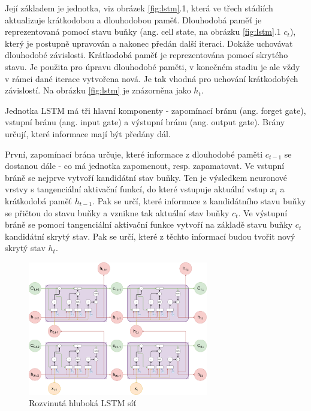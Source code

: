 Její základem je jednotka, viz obrázek \ref{fig:lstm}.1, která ve třech
stádiích aktualizuje krátkodobou a dlouhodobou paměť. Dlouhodobá paměť je
reprezentovaná pomocí stavu buňky (ang. cell state, na obrázku \ref{fig:lstm}.1
$c_t$), který je postupně upravován a nakonec předán další iteraci. Dokáže
uchovávat dlouhodobé závislosti. Krátkodobá paměť je reprezentována pomocí
skrytého stavu. Je použita pro úpravu dlouhodobé paměti, v konečném stadiu je
ale vždy v rámci dané iterace vytvořena nová. Je tak vhodná pro uchování
krátkodobých závislostí. Na obrázku \ref{fig:lstm} je znázorněna jako $h_t$.

Jednotka LSTM má tři hlavní komponenty - zapomínací bránu (ang. forget gate),
vstupní bránu (ang. input gate) a výstupní bránu (ang. output gate). Brány
určují, které informace mají být předány dál.

První, zapomínací brána určuje, které informace z dlouhodobé paměti $c_{t-1}$
se dostanou dále - co má jednotka zapomenout, resp. zapamatovat. Ve vstupní
bráně se nejprve vytvoří kandidátní stav buňky. Ten je výsledkem neuronové
vrstvy s tangenciální aktivační funkcí, do které vstupuje aktuální vstup $x_t$
a krátkodobá paměť $h_{t-1}$. Pak se určí, které informace z kandidátního stavu
buňky se přičtou do stavu buňky a vznikne tak aktuální stav buňky $c_t$. Ve
výstupní bráně se pomocí tangenciální aktivační funkce vytvoří na základě stavu
buňky $c_t$ kandidátní skrytý stav. Pak se určí, které z těchto informací budou
tvořit nový skrytý stav $h_t$.

\begin{figure}
    \centering
    \includegraphics[width=0.7\textwidth]{Figures/LSTM_deep.pdf}
    \caption{Rozvinutá hluboká LSTM síť}
    \label{fig:lstm_deep}
\end{figure}

